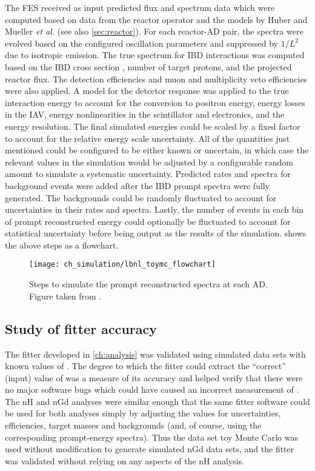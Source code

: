 The FES received as input predicted \nuebar{} flux and spectrum data
which were computed \cite{christine_reactor} based on data from the reactor operator
and the models by Huber \cite{reactor_huber}
and Mueller \emph{et al.} \cite{reactor_mueller} (see also \cref{sec:reactor}).
For each reactor-AD pair, the spectra were evolved
based on the configured oscillation parameters
and suppressed by $1/L^2$ due to isotropic emission.
The true \nuebar{} spectrum for IBD interactions was computed
based on the IBD cross section \cite{ibd_xsec,ibd_xsec_note},
number of target protons, and the projected reactor flux.
The detection efficiencies and muon and multiplicity veto efficiencies
were also applied.
A model for the detector response was applied to the true interaction energy
to account for the conversion to positron energy,
energy losses in the IAV,
energy nonlinearities in the scintillator and electronics,
and the energy resolution.
The final simulated energies could be scaled by a fixed factor
to account for the relative energy scale uncertainty.
All of the quantities just mentioned could be configured
to be either known or uncertain, in which case
the relevant values in the simulation would be
adjusted by a configurable random amount
to simulate a systematic uncertainty.
Predicted rates and spectra for background events
were added after the IBD prompt spectra were fully generated.
The backgrounds could be randomly fluctuated to account for
uncertainties in their rates and spectra.
Lastly, the number of events in each bin of prompt reconstructed energy
could optionally be fluctuated to account for statistical uncertainty
before being output as the results of the simulation.
 shows the above steps as a flowchart.

\begin{figure}
    \centering
    \texttt{[image: ch\_simulation/lbnl\_toymc\_flowchart]}
    \caption[Flowchart of data set toy Monte Carlo]{
        Steps to simulate the prompt reconstructed spectra
        at each AD.
        Figure taken from \cite{lbnl_toymc}.
    }
    \label{fig:lbnl_toymc_flowchart}
\end{figure}

\subsection{Study of fitter accuracy}
\label{subsec:fitter_validation}

The fitter developed in \cref{ch:analysis} was validated
using simulated data sets with known values of \thetaot{}.
The degree to which the fitter could extract
the ``correct'' (input) value of \thetaot{}
was a measure of its accuracy
and helped verify that there were no major software bugs
which could have caused an incorrect measurement of \thetaot{}.
The nH and nGd analyses were similar enough
that the same fitter software could be used for both analyses
simply by adjusting the values for uncertainties, efficiencies,
target masses and backgrounds
(and, of course, using the corresponding prompt-energy spectra).
Thus the data set toy Monte Carlo was used without modification
to generate simulated nGd data sets,
and the fitter was validated without relying on
any aspects of the nH analysis.

